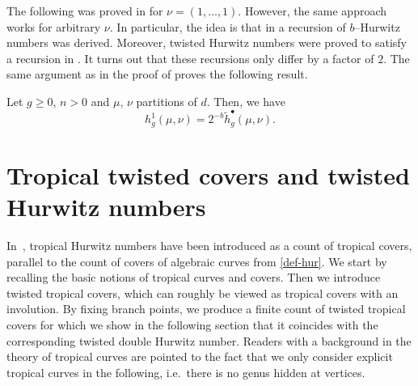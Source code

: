 \documentclass[ALCO,published]{cedram}
\begin{document}
The following was proved in \cite[Theorem 3.2]{BF21} for $\nu=(1,\dots,1)$. However, the same approach works for arbitrary $\nu$. In particular, the idea is that in \cite[Theorem 6.5]{chapuy2020non} a recursion of $b$--Hurwitz numbers was derived. Moreover, twisted Hurwitz numbers were proved to satisfy a recursion in \cite[Theorem 2.12]{BF21}. It turns out that these recursions only differ by a factor of $2$. The same argument as in the proof of \cite[Theorem 3.2]{BF21} proves the following result.

\begin{theo}
    Let $g\ge0$, $n>0$ and $\mu$, $\nu$ partitions of $d$. Then, we have
    \begin{equation*}
        h^1_g(\mu,\nu)=2^{-b}\tilde{h}_g^{\bullet}(\mu,\nu).
    \end{equation*}
\end{theo}

\section{Tropical twisted covers and twisted Hurwitz numbers}
\label{sec:troptwist}

In~\cite{CJM10}, tropical Hurwitz numbers have been introduced as a count of tropical covers, parallel to the count of covers of algebraic curves from \cref{def-hur}. We start by recalling the basic notions of tropical curves and covers. Then we introduce twisted tropical covers, which can roughly be viewed as tropical covers with an involution. By fixing branch points, we produce a finite count of twisted tropical covers for which we show in the following section that it coincides with the corresponding twisted double Hurwitz number. Readers with a background in the theory of tropical curves are pointed to the fact that we only consider explicit tropical curves in the following, i.e.\ there is no genus hidden at vertices.
\end{document}
